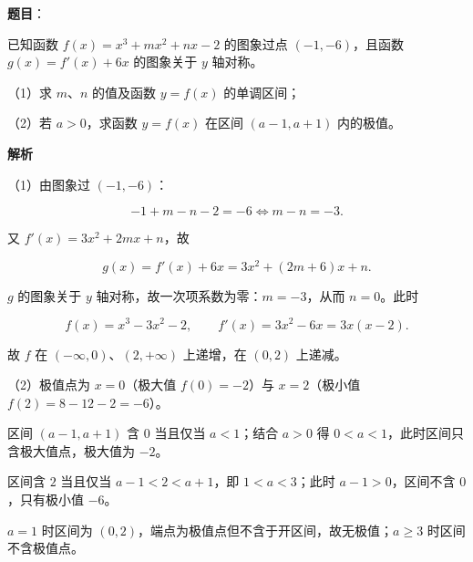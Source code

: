 \begin{answer}

\textbf{题目}：

已知函数 $f(x)=x^3+mx^2+nx-2$ 的图象过点 $(-1,-6)$，且函数 $g(x)=f'(x)+6x$ 的图象关于 $y$ 轴对称。

（1）求 $m$、$n$ 的值及函数 $y=f(x)$ 的单调区间；

（2）若 $a>0$，求函数 $y=f(x)$ 在区间 $(a-1,a+1)$ 内的极值。

\textbf{解析}

（1）由图象过 $(-1,-6)$：

\nopagebreak[4]
\[-1+m-n-2=-6\iff m-n=-3.\]

又 $f'(x)=3x^2+2mx+n$，故

\nopagebreak[4]
\[g(x)=f'(x)+6x=3x^2+(2m+6)x+n.\]

$g$ 的图象关于 $y$ 轴对称，故一次项系数为零：$m=-3$，从而 $n=0$。此时

\nopagebreak[4]
\[f(x)=x^3-3x^2-2,\qquad f'(x)=3x^2-6x=3x(x-2).\]

故 $f$ 在 $(-\infty,0)$、$(2,+\infty)$ 上递增，在 $(0,2)$ 上递减。

（2）极值点为 $x=0$（极大值 $f(0)=-2$）与 $x=2$（极小值 $f(2)=8-12-2=-6$）。

区间 $(a-1,a+1)$ 含 $0$ 当且仅当 $a<1$；结合 $a>0$ 得 $0<a<1$，此时区间只含极大值点，极大值为 $-2$。

区间含 $2$ 当且仅当 $a-1<2<a+1$，即 $1<a<3$；此时 $a-1>0$，区间不含 $0$，只有极小值 $-6$。

$a=1$ 时区间为 $(0,2)$，端点为极值点但不含于开区间，故无极值；$a\geqslant3$ 时区间不含极值点。


\end{answer}
